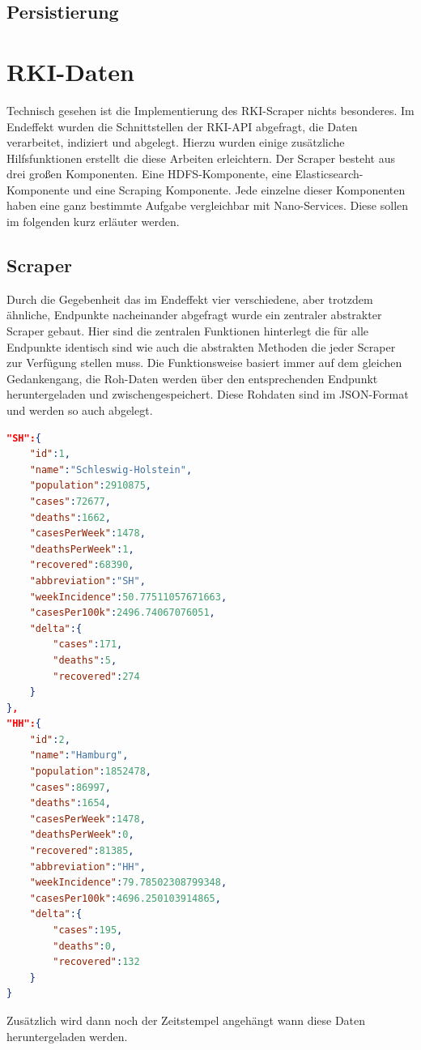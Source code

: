 \documentclass[12pt,oneside,a4paper,parskip]{scrbook}
\begin{document}
\subsection{Persistierung}

\section{RKI-Daten}
Technisch gesehen ist die Implementierung des RKI-Scraper nichts besonderes. Im Endeffekt wurden die Schnittstellen der RKI-API abgefragt, die Daten verarbeitet, indiziert und abgelegt. Hierzu wurden einige zus\"atzliche Hilfsfunktionen erstellt die diese Arbeiten erleichtern. \newline
Der Scraper besteht aus drei großen Komponenten. Eine HDFS-Komponente, eine Elasticsearch-Komponente und eine Scraping Komponente. Jede einzelne dieser Komponenten haben eine ganz bestimmte Aufgabe vergleichbar mit Nano-Services. Diese sollen im folgenden kurz erl\"auter werden.
\subsection{Scraper}
Durch die Gegebenheit das im Endeffekt vier verschiedene, aber trotzdem \"ahnliche, Endpunkte nacheinander abgefragt wurde ein zentraler abstrakter Scraper gebaut. Hier sind die zentralen Funktionen hinterlegt die f\"ur alle Endpunkte identisch sind wie auch die abstrakten Methoden die jeder Scraper zur Verf\"ugung stellen muss. \newline
Die Funktionsweise basiert immer auf dem gleichen Gedankengang, die Roh-Daten werden \"uber den entsprechenden Endpunkt heruntergeladen und zwischengespeichert. Diese Rohdaten sind im JSON-Format und werden so auch abgelegt.
\begin{lstlisting}[caption=Inzidenz Rohdaten der Corona-API ,label=incidencedataraw,language=json]
"SH":{
	"id":1,
	"name":"Schleswig-Holstein",
	"population":2910875,
	"cases":72677,
	"deaths":1662,
	"casesPerWeek":1478,
	"deathsPerWeek":1,
	"recovered":68390,
	"abbreviation":"SH",
	"weekIncidence":50.77511057671663,
	"casesPer100k":2496.74067076051,
	"delta":{
		"cases":171,
		"deaths":5,
		"recovered":274
	}
},
"HH":{
	"id":2,
	"name":"Hamburg",
	"population":1852478,
	"cases":86997,
	"deaths":1654,
	"casesPerWeek":1478,
	"deathsPerWeek":0,
	"recovered":81385,
	"abbreviation":"HH",
	"weekIncidence":79.78502308799348,
	"casesPer100k":4696.250103914865,
	"delta":{
		"cases":195,
		"deaths":0,
		"recovered":132
	}
}
\end{lstlisting}
Zus\"atzlich wird dann noch der Zeitstempel angeh\"angt wann diese Daten heruntergeladen werden.
\end{document}
